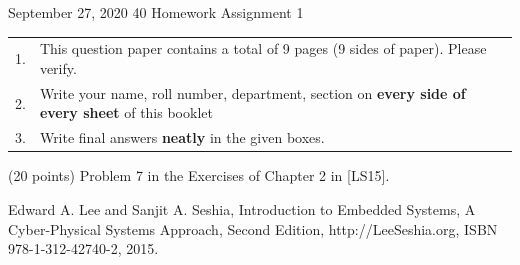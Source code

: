 \documentclass[a4paper, 12pt]{article}
\begin{document}
\vspace*{14ex}

           {September 27, 2020}      					         		%
					 {40}											%
					 {Homework Assignment 1}							%
					
\begin{tabular}{cl}
1. & This question paper contains a total of 9 pages (9 sides of paper). Please verify.\\
2. & Write your name, roll number, department, section on \textbf{every side of every sheet} of this booklet\\
3. & Write final answers \textbf{neatly} in the given boxes.\\
\end{tabular}


\begin{problem}{}
(20 points) Problem 7 in the Exercises of Chapter 2 in [LS15]. 

\noindent
[LS15] Edward A. Lee and Sanjit A. Seshia, Introduction to Embedded Systems, A Cyber-Physical Systems Approach, Second Edition, http://LeeSeshia.org, ISBN 978-1-312-42740-2, 2015. \\
\\
\begin{minipage}{1\textwidth}
		\rectangle{\linewidth}{20cm}
\end{minipage}
\newpage
\ \\
\begin{minipage}{1\textwidth}
		\rectangle{\linewidth}{24cm}
\end{minipage}
\newpage
\ \\
\begin{minipage}{1\textwidth}
		\rectangle{\linewidth}{24cm}
\end{minipage}
\newpage
\ \\
\begin{minipage}{1\textwidth}
		\rectangle{\linewidth}{24cm}
\end{minipage}
\end{problem}

\newpage
\end{document}
